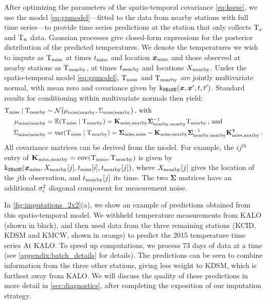After optimizing the parameters of the spatio-temporal covariance \autoref{eq:ksese}, we use the model \autoref{eq:gpmodel}---fitted to the data from nearby stations with full time series---to provide time series predictions at the station that only collects \(\mathrm{T}_{x}\) and \(\mathrm{T}_{n}\) data.
Gaussian processes give closed-form expressions for the posterior distribution of the predicted temperatures.
We denote the temperatures we wish to impute as \(\mathrm{T}_{\mathrm{miss}}{}\) at times \(t_{\mathrm{miss}}\) and location \(\bm{x}_{\mathrm{miss}}\) and those observed at nearby stations as \(\mathrm{T}_{\mathrm{nearby}}{}\), at times \(t_{\mathrm{nearby}}\) and locations \(X_{\mathrm{nearby}}\).
Under the spatio-temporal model \autoref{eq:gpmodel}, \(\mathrm{T}_{\mathrm{miss}}\) and \(\mathrm{T}_{\mathrm{nearby}}\) are jointly multivariate normal, with mean zero and covariance given by \(\operatorname{k_{\mathtt{SExSE}}}(\bm{x},\bm{x}',t,t')\).
Standard results for conditioning within multivariate normals then yield:
\begin{equation}
\begin{split}
    \Temp_\miss \mid \Temp_\obs &\sim \normal\del{\mu_{\miss \mid \obs}, \Sigma_{\miss \mid \obs}}\,\text{, with} \\
    \mu_{\miss \mid \obs} &= \E \del{\Temp_\miss \mid \Temp_\obs} = \Kmo \Soo^{-1} \Temp_\obs \,\text{, and} \\
    \Sigma_{\miss \mid \obs} &= \var \del{\Temp_\miss \mid \Temp_\obs} = \Smm - \Kmo \Soo^{-1} \Kmo\trans
    \,.
\end{split}
\label{eq:unconstrained_post}
\end{equation}
All covariance matrices can be derived from the model.
For example, the \(ij^{\text{th}}\) entry of \(\Kmo = \cov\del{\Temp_\miss, \Temp_\obs}\) is given by \(\kSESE(\xvec_\miss,X_\obs\sbr{j},t_\miss\sbr{i},t_\obs\sbr{j})\), where \(X_\obs\sbr{j}\) gives the location of the \(j\)th observation, and \(t_\obs\sbr{j}\) its time.
The two \(\mathbold{\Sigma}\) matrices have an additional \(\sigma_{\epsilon}^2\) diagonal component for measurement noise.

In \autoref{fig:imputations_2x2}(a), we show an example of predictions obtained from this spatio-temporal model. 
We withheld temperature measurements from KALO (shown in black), and then used data from the three remaining stations (KCID, KDSM and KMCW, shown in orange) to predict the 2015 temperature time series At KALO.
To speed up computations, we process 73 days of data at a time (see \autoref{appendix:batch_details} for details).
The predictions can be seen to combine information from the three other stations, giving less weight to KDSM, which is furthest away from KALO.
We will discuss the quality of these predictions in more detail in \autoref{sec:diagnostics}, after completing the exposition of our imputation strategy.

